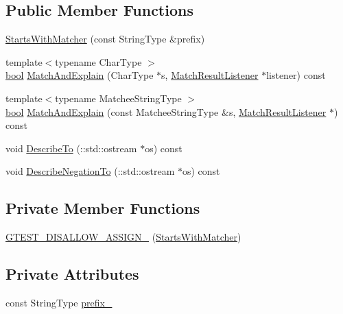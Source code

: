 \subsection*{Public Member Functions}
\begin{DoxyCompactItemize}
\item 
\hyperlink{classtesting_1_1internal_1_1StartsWithMatcher_ab06a2a2a4c506771f20754bdbf8742bc}{Starts\+With\+Matcher} (const String\+Type \&prefix)
\item 
{\footnotesize template$<$typename Char\+Type $>$ }\\\hyperlink{classbool}{bool} \hyperlink{classtesting_1_1internal_1_1StartsWithMatcher_a90d9435fba4d15b0d47cf1d7e931305b}{Match\+And\+Explain} (Char\+Type $\ast$s, \hyperlink{classtesting_1_1MatchResultListener}{Match\+Result\+Listener} $\ast$listener) const
\item 
{\footnotesize template$<$typename Matchee\+String\+Type $>$ }\\\hyperlink{classbool}{bool} \hyperlink{classtesting_1_1internal_1_1StartsWithMatcher_a44f89298278ab77b0b2c891b939b7fc1}{Match\+And\+Explain} (const Matchee\+String\+Type \&s, \hyperlink{classtesting_1_1MatchResultListener}{Match\+Result\+Listener} $\ast$) const
\item 
void \hyperlink{classtesting_1_1internal_1_1StartsWithMatcher_af52b4c04ade7f5226c7302c845d44eaf}{Describe\+To} (\+::std\+::ostream $\ast$os) const
\item 
void \hyperlink{classtesting_1_1internal_1_1StartsWithMatcher_aae30b57dac10fec73d454b6d7543acea}{Describe\+Negation\+To} (\+::std\+::ostream $\ast$os) const
\end{DoxyCompactItemize}
\subsection*{Private Member Functions}
\begin{DoxyCompactItemize}
\item 
\hyperlink{classtesting_1_1internal_1_1StartsWithMatcher_a1e3864211b6430dbe7b5f37a0d525045}{G\+T\+E\+S\+T\+\_\+\+D\+I\+S\+A\+L\+L\+O\+W\+\_\+\+A\+S\+S\+I\+G\+N\+\_\+} (\hyperlink{classtesting_1_1internal_1_1StartsWithMatcher}{Starts\+With\+Matcher})
\end{DoxyCompactItemize}
\subsection*{Private Attributes}
\begin{DoxyCompactItemize}
\item 
const String\+Type \hyperlink{classtesting_1_1internal_1_1StartsWithMatcher_a9122de4c38f40c95f822fb8d290942f9}{prefix\+\_\+}
\end{DoxyCompactItemize}


